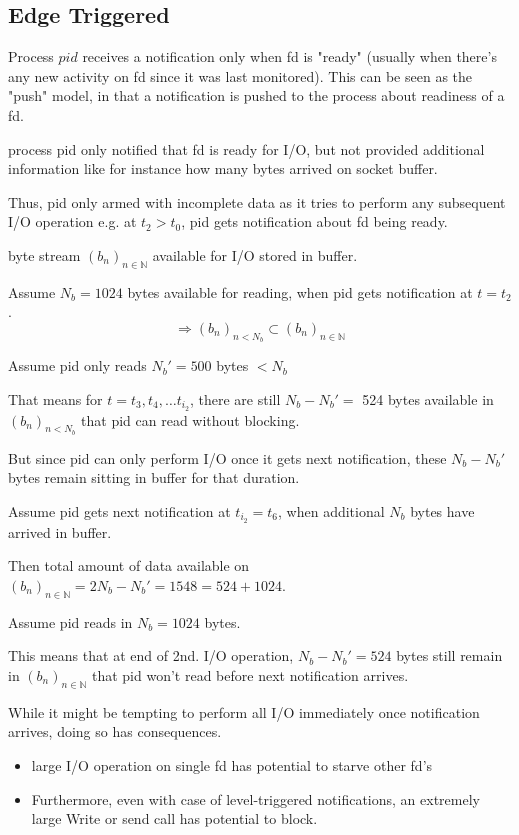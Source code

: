 \documentclass[10pt]{amsart}
\begin{document}
\subsection{Edge Triggered}

Process $pid$ receives a notification only when fd is "ready" (usually when there's any new activity on fd since it was last monitored). This can be seen as the "push" model, in that a notification is pushed to the process about readiness of a fd.

process pid only notified that fd is ready for I/O, but not provided additional information like for instance how many bytes arrived on socket buffer.

Thus, pid only armed with incomplete data as it tries to perform any subsequent I/O operation 
e.g. 
at $t_2 > t_0$, pid gets notification about fd being ready.

byte stream $(b_n)_{n\in \mathbb{N}}$ available for I/O stored in buffer.

Assume $N_b = 1024$ bytes available for reading, when pid gets notification at $t= t_2$. 
\[
\Longrightarrow (b_n)_{n <N_b} \subset (b_n)_{n\in \mathbb{N}}
\]

Assume pid only reads $N_b' = 500$ bytes $<N_b$

That means for $t=t_3, t_4, \dots t_{i_2}$, there are still $N_b - N_b' = $ 524 bytes available in $(b_n)_{n < N_b}$ that pid can read without blocking.

But since pid can only perform I/O once it gets next notification, these $N_b - N_b'$ bytes remain sitting in buffer for that duration.

Assume pid gets next notification at $t_{i_2} = t_6$, when additional $N_b$ bytes have arrived in buffer.

Then total amount of data available on $(b_n)_{n\in \mathbb{N}} = 2N_b - N_b' = 1548 = 524 + 1024$.

Assume pid reads in $N_b = 1024$ bytes.

This means that at end of 2nd. I/O operation, $N_b - N_b' = 524$ bytes still remain in $(b_n)_{n\in \mathbb{N}}$ that pid won't read before next notification arrives.

While it might be tempting to perform all I/O immediately once notification arrives, doing so has consequences. 
\begin{itemize}
	\item large I/O operation on single fd has potential to starve other fd's 
	\item Furthermore, even with case of level-triggered notifications, an extremely large Write or send call has potential to block.
\end{itemize}
\end{document}
